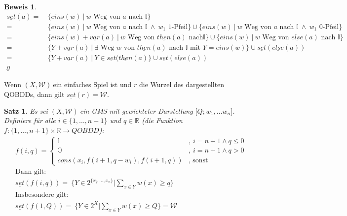 \documentclass[ngerman]{scrartcl}
\theoremstyle{custom}
\newtheorem{ms}[mdef]{Satz}
\newtheorem*{bw}{Beweis}
\newcommand{\0}{\mathbf{0}}
\newcommand{\1}{\mathbf{L}}
\newcommand{\then}{\underline{then}}
\newcommand{\el}{\underline{else}}
\newcommand{\var}{\underline{var}}
\newcommand{\set}{\underline{set}}
\newcommand{\cons}{\underline{cons}}
\newcommand{\sg}{$(X,\mathcal{W})~$}
\newcommand{\gms}{$\lbrack Q; w_1, \dots w_n \rbrack$}
\begin{document}
\begin{bw}
\begin{align*}
\set(a) =&~ \{ eins(w) ~\vert~ w \text{ Weg von } a \text{ nach }
\mathds{I}\}\\
=&~ \{ eins(w) ~\vert~ w \text{ Weg von } a \text{ nach } \mathds{I}
~\wedge~ w_1 \text{ 1-Pfeil}\} \cup \{eins(w) ~\vert~ w \text{ Weg von } a \text{ nach } \mathds{I}
~\wedge~ w_1 \text{ 0-Pfeil}\} \\
=&~ \{ eins(w)+\var(a) ~\vert~ w \text{ Weg von } \then(a) \text{ nach
} \mathds{I}\} \cup \{ eins(w) ~\vert~ w \text{ Weg von } \el(a)
  \text{ nach } \mathds{I}\} \\
=&~ \{ Y+\var(a) ~\vert~ \exists\text{ Weg } w \text{ von } \then(a) \text{ nach }
\mathds{I} \text{ mit } Y = eins(w)\} \cup \set(\el(a))\\
=&~\{Y+\var(a) ~\vert~ Y \in \set(\then(a)\} \cup \set(\el(a))
\end{align*}
\qed
\end{bw}

Wenn \sg ein einfaches Spiel ist und $r$ die Wurzel des dargestellten QOBDDs,
dann gilt $\set(r) = \mathcal{W}$.

\begin{ms}\label{sat:fiq}
Es sei \sg ein GMS mit gewichteter Darstellung \gms. Definiere f\"ur
alle $i \in \{1, \dots, n+1\}$ und $q \in \mathds{R}$ (die Funktion
$f:\{1, \dots, n+1\} \times \mathds{R} \rightarrow QOBDD$):
\begin{align*}
&f(i,q) = \begin{cases}
\mathds{I} &,~ i = n+1 \wedge q \leq 0\\
\mathds{O} &,~ i = n+1 \wedge q > 0\\
\cons(x_i, f(i+1, q-w_i), f(i+1, q)) &,\text{ sonst }
\end{cases}\\
&\text{Dann gilt:}\\
&\set(f(i,q)) = ~\biggr \{ Y \in 2^{\{x_i,\dots,x_n\}} \biggr \vert \sum_{x \in Y} w(x)
\geq q \biggr\}\\
&\text{Insbesondere gilt:}\\
&\set(f(1,Q))= ~\biggr\{Y \in 2^X \biggr \vert \sum_{x \in Y} w(x) \geq
Q \biggr \} = \mathcal{W}
\end{align*}
\end{ms}
\end{document}
